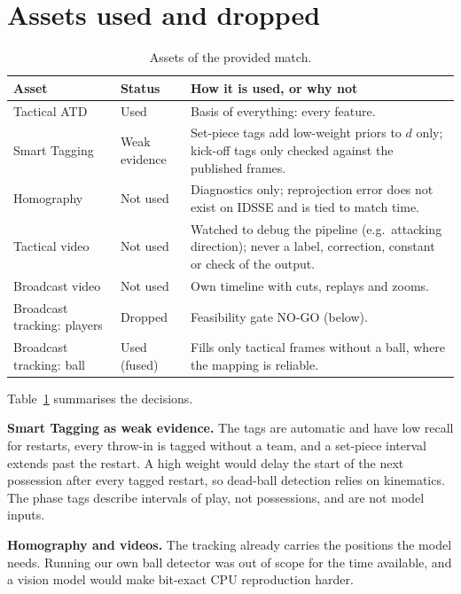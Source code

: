 \documentclass[journal]{IEEEtran}
\begin{document}
\section{Assets used and dropped}
\label{sec:assets}

\begin{table}[t]
\caption{Assets of the provided match.}
\label{tab:assets}
\centering
\footnotesize
\begin{tabular}{@{}>{\raggedright\arraybackslash}p{1.75cm}>{\raggedright\arraybackslash}p{1.35cm}>{\raggedright\arraybackslash}p{4.55cm}@{}}
\toprule
Asset & Status & How it is used, or why not\\
\midrule
Tactical ATD & Used & Basis of everything: every feature.\\
Smart Tagging & Weak evidence & Set-piece tags add low-weight priors to $d$ only; kick-off tags only checked against the published frames.\\
Homography & Not used & Diagnostics only; reprojection error does not exist on IDSSE and is tied to match time.\\
Tactical video & Not used & Watched to debug the pipeline (e.g.\ attacking direction); never a label, correction, constant or check of the output.\\
Broadcast video & Not used & Own timeline with cuts, replays and zooms.\\
Broadcast tracking: players & Dropped & Feasibility gate NO-GO (below).\\
Broadcast tracking: ball & Used (fused) & Fills only tactical frames without a ball, where the mapping is reliable.\\
\bottomrule
\end{tabular}
\end{table}

Table~\ref{tab:assets} summarises the decisions.

\textbf{Smart Tagging as weak evidence.} The tags are automatic and have low recall for restarts, every throw-in is tagged without a team, and a set-piece interval extends past the restart. A high weight would delay the start of the next possession after every tagged restart, so dead-ball detection relies on kinematics. The phase tags describe intervals of play, not possessions, and are not model inputs.

\textbf{Homography and videos.} The tracking already carries the positions the model needs. Running our own ball detector was out of scope for the time available, and a vision model would make bit-exact CPU reproduction harder.
\end{document}
